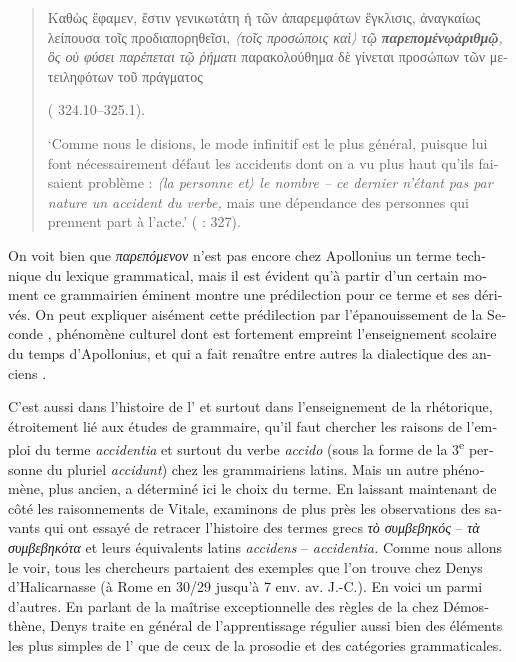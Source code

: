 \documentclass[output=paper]{langsci/langscibook}
\begin{document}
\begin{otherlanguage}{french}
\begin{quote}
    \begin{otherlanguage}{greek}
    Καθὼς ἔφαμεν, ἔστιν γενικωτάτη ἡ τῶν ἀπαρεμφάτων ἔγκλισις, ἀναγκαίως λείπουσα τοῖς προδιαπορηθεῖσι, \textit{〈τοῖς προσώποις καὶ〉 τῷ {\textbf{{παρεπομένῳ\linebreak ἀριθμῷ}}, ὃς οὐ φύσει παρέπεται τῷ ῥήματι}} παρακολούθημα δὲ γίνεται προ\-σώπων τῶν μετειληφότων τοῦ πράγματος
    \end{otherlanguage} ( 324.10--325.1).
    
    `Comme nous le disions, le mode infinitif est le plus général, puisque lui font nécessairement défaut les accidents dont on a vu plus haut qu’ils faisaient problème : \textit{〈la personne et〉 le nombre – ce dernier n’étant pas par nature un accident du verbe,} mais une dépendance des personnes qui prennent part à l’acte.' (\citealt{lallot_apollonius_1997} : 327).

\end{quote}

On voit bien que \textit{παρεπόμενον} n’est pas encore chez Apollonius un terme technique du lexique grammatical, mais il est évident qu’à partir d’un certain moment ce grammairien éminent montre une prédilection pour ce terme et ses dérivés. On peut expliquer aisément cette prédilection par l’épanouissement de la Seconde , phénomène culturel dont est fortement empreint l’enseignement scolaire du temps d’Apollonius, et qui a fait renaître entre autres la dialectique des anciens . 

C’est aussi dans l’histoire de l’ et surtout dans l’enseignement de la rhétorique, étroitement lié aux études de grammaire, qu’il faut chercher les raisons de l’emploi du terme \textit{accidentia} et surtout du verbe \textit{accido} (sous la forme de la 3\textsuperscript{e} personne du pluriel \textit{accidunt}) chez les grammairiens latins. Mais un autre phénomène, plus ancien, a déterminé ici le choix du terme. En laissant maintenant de côté les raisonnements de Vitale, examinons de plus près les observations des savants qui ont essayé de retracer l’histoire des termes grecs \textit{τὸ συμβεβηκός} – \textit{τὰ συμβεβηκότα} et leurs équivalents latins \textit{accidens} – \textit{accidentia.} Comme nous allons le voir, tous les chercheurs partaient des exemples que l’on trouve chez Denys d’Halicarnasse (à Rome en 30/29 jusqu’à 7 env. av. J.-C.). En voici un parmi d’autres. En parlant de la maîtrise exceptionnelle des règles de la  chez Démosthène, Denys traite en général de l’apprentissage régulier aussi bien des éléments les plus simples de l’ que de ceux de la prosodie et des catégories grammaticales. 


\end{otherlanguage}
\end{document}
